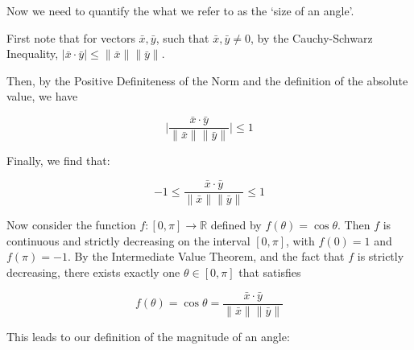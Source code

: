 \begin{center}
    

\end{center}

Now we need to quantify the what we refer to as the `size of an angle'.

\vspace{1em}

First note that for vectors \(\bar{x}, \bar{y}\), such that \(\bar{x},\bar{y} \neq 0\), by the Cauchy-Schwarz Inequality,
\(|\bar{x}\cdot \bar{y}| \leq \|\bar{x}\| \|\bar{y}\| \).

Then, by the Positive Definiteness of the Norm and the definition of the absolute value, we have

\[
    \bigg|\frac{\bar{x}\cdot \bar{y}}{\|\bar{x}\| \|\bar{y}\|}\bigg| \leq 1
\]

Finally, we find that:

\[
-1 \leq \frac{\bar{x}\cdot \bar{y}}{\|\bar{x}\| \|\bar{y}\|}\leq 1
\]

Now consider the function \(f : [0,\pi] \rightarrow \mathbb{R}\) defined by \(f(\theta)= \cos \theta\). Then \(f\) is continuous and strictly decreasing 
on the interval \([0,\pi]\), with \(f(0) = 1\) and \(f(\pi) = -1\). By the Intermediate Value Theorem, and the fact that $f$ is strictly decreasing, there exists exactly one \( \theta \in [0,\pi] \) that satisfies 

\[
    f(\theta) = \cos \theta = \frac{\bar{x}\cdot \bar{y}}{\|\bar{x}\| \|\bar{y}\|}
\]

This leads to our definition of the magnitude of an angle:

